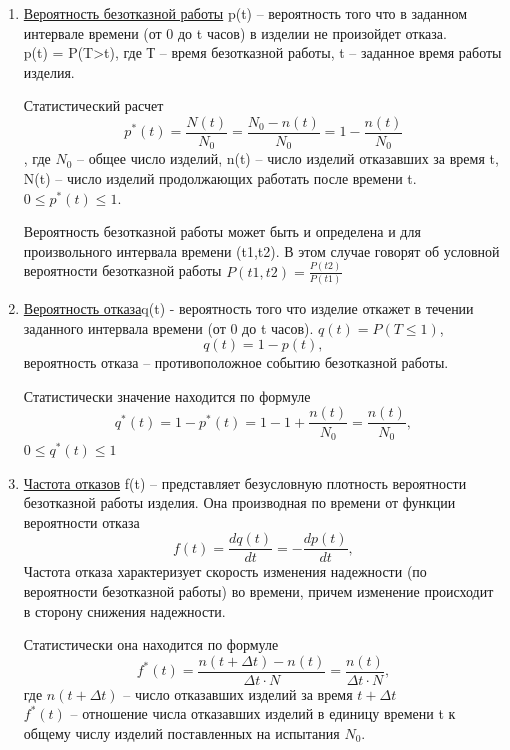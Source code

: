 \documentclass[unicode, 12pt, a4paper, oneside]{article}
\begin{document}
\begin{enumerate}


\item \underline{	Вероятность безотказной работы} p(t) – вероятность того что в заданном интервале времени (от 0 до t часов) в изделии не произойдет отказа.\\
p(t) = P(T>t), где Т – время безотказной работы, t – заданное время работы изделия.

Статистический расчет \\
\begin{equation}
p^{*}(t) = \frac{N(t)}{N_0} = \frac{N_0 - n(t)}{N_0} = 1- \frac{n(t)}{N_0}
\end{equation}, где $N_0$ – общее число изделий, n(t) – число изделий отказавших за время t, N(t) – число изделий продолжающих работать после времени t.\\
$0 \leqslant p^{*}(t) \leqslant 1$.

Вероятность безотказной работы может быть и определена и для произвольного интервала времени (t1,t2). В этом случае говорят об условной вероятности безотказной работы
$P(t1,t2) = \frac{ P(t2)}{P(t1)}$
\item  \underline{	Вероятность отказа}q(t) - вероятность того что изделие откажет в течении заданного интервала времени (от 0 до t часов).
$q(t) = P(T \leqslant 1)$,
\begin{equation}
q(t) = 1-p(t),
\end{equation}
 вероятность отказа – противоположное событию безотказной работы.
 
Статистически значение находится по формуле\\
\begin{equation} q^{*}(t) = 1-p^{*}(t) = 1-1+\frac{n(t)}{N_0}=\frac{n(t)}{N_0},
\end{equation}
$0 \leqslant q^{*}(t)\leqslant 1$
\item	\underline{Частота отказов} f(t) – представляет безусловную плотность вероятности безотказной работы изделия. Она производная по времени от функции вероятности отказа\\
\begin{equation}f(t) = \frac{dq(t)}{dt} = -\frac{dp(t)}{dt} ,
\end{equation}
Частота отказа характеризует скорость изменения надежности (по вероятности безотказной работы) во времени, причем изменение происходит в сторону снижения надежности.

Статистически  она находится по формуле
\begin{equation}f^{*}(t) = \frac{n(t+\Delta t)-n(t)}{\Delta t \cdot N}= \frac{n(t)}{\Delta t \cdot N},
\end{equation} где $n(t+ \Delta t)$ – число отказавших изделий за время $ t+\Delta t$ \\
$f^{*}(t)$ – отношение числа отказавших изделий  в единицу времени t к общему числу изделий поставленных на испытания $N_0$.


\end{enumerate}
\end{document}
